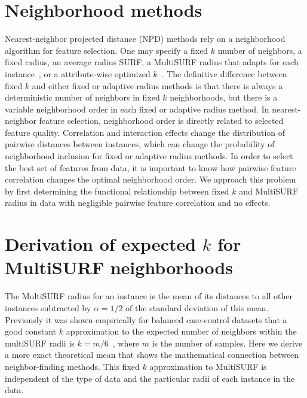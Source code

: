 \documentclass[10pt,letterpaper]{article}
\begin{document}
\section{Neighborhood methods}
Nearest-neighbor projected distance (NPD) methods rely on a neighborhood algorithm for feature selection. One may specify a fixed $k$ number of neighbors, a fixed radius, an average radius SURF, a MultiSURF radius that adapts for each instance~\cite{urbanowicz17}, or a attribute-wise optimized $k$~\cite{mckinney13}. The definitive difference between fixed $k$ and either fixed or adaptive radius methods is that there is always a deterministic number of neighbors in fixed $k$ neighborhoods, but there is a variable neighborhood order in each fixed or adaptive radius method. In nearest-neighbor feature selection, neighborhood order is directly related to selected feature quality. Correlation and interaction effects change the distribution of pairwise distances between instances, which can change the probability of neighborhood inclusion for fixed or adaptive radius methods. In order to select the best set of features from data, it is important to know how pairwise feature correlation changes the optimal neighborhood order. We approach this problem by first determining the functional relationship between fixed $k$ and MultiSURF radius in data with negligible pairwise feature correlation and no effects.

\section{Derivation of expected \texorpdfstring{$k$}{} for MultiSURF neighborhoods}\label{sec:expected-k}
The MultiSURF radius for an instance is the mean of its distances to all other instances subtracted by $\alpha=1/2$ of the standard deviation of this mean. Previously it was shown empirically for balanced case-control datasets that a good constant $k$ approximation to the expected number of neighbors within the multiSURF radii is $k=m/6$~\cite{stir}, where $m$ is the number of samples. Here we derive a more exact theoretical mean that shows the mathematical connection between neighbor-finding methods. This fixed $k$ approximation to MultiSURF is independent of the type of data and the particular radii of each instance in the data.
\end{document}
